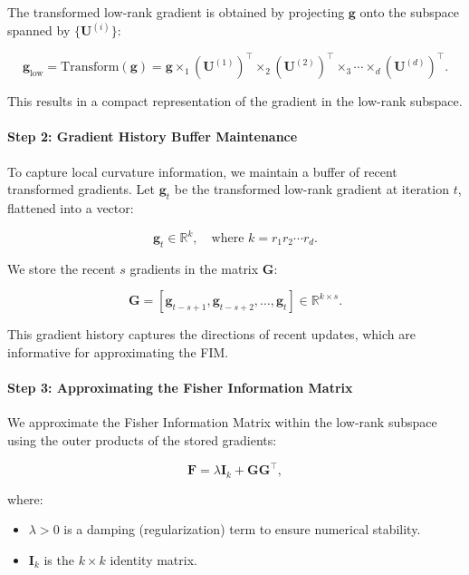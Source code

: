 The transformed low-rank gradient is obtained by projecting $\mathbf{g}$ onto the subspace spanned by $\{\mathbf{U}^{(i)}\}$:

\[
\mathbf{g}_{\text{low}} = \text{Transform}(\mathbf{g}) = \mathbf{g} \times_1 (\mathbf{U}^{(1)})^\top \times_2 (\mathbf{U}^{(2)})^\top \times_3 \cdots \times_d (\mathbf{U}^{(d)})^\top.
\]

This results in a compact representation of the gradient in the low-rank subspace.

\paragraph{Step 2: Gradient History Buffer Maintenance}



To capture local curvature information, we maintain a buffer of recent transformed gradients. Let $\mathbf{g}_t$ be the transformed low-rank gradient at iteration $t$, flattened into a vector:

\[
\mathbf{g}_t \in \mathbb{R}^{k}, \quad \text{where } k = r_1 r_2 \cdots r_d.
\]

We store the recent $s$ gradients in the matrix $\mathbf{G}$:

\[
\mathbf{G} = [\mathbf{g}_{t - s + 1}, \mathbf{g}_{t - s + 2}, \dots, \mathbf{g}_t] \in \mathbb{R}^{k \times s}.
\]

This gradient history captures the directions of recent updates, which are informative for approximating the FIM.

\paragraph{Step 3: Approximating the Fisher Information Matrix}

We approximate the Fisher Information Matrix within the low-rank subspace using the outer products of the stored gradients:

\[
\mathbf{F} = \lambda \mathbf{I}_k + \mathbf{G} \mathbf{G}^\top,
\]

where:

\begin{itemize}
    \item $\lambda > 0$ is a damping (regularization) term to ensure numerical stability.
    \item $\mathbf{I}_k$ is the $k \times k$ identity matrix.
\end{itemize}

